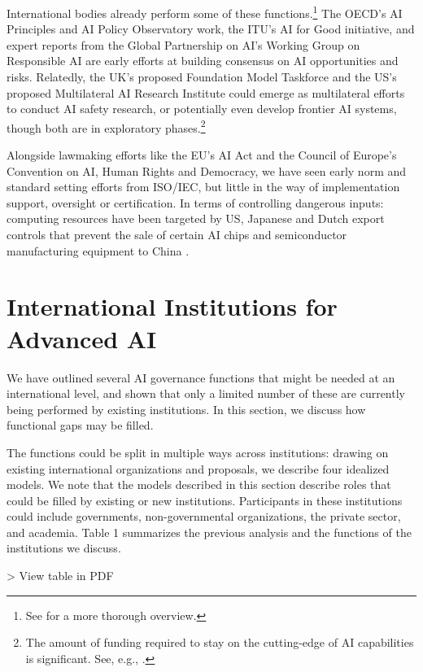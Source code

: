 \documentclass[12pt]{article}
\begin{document}
International bodies already perform some of these functions.\footnote{See
\cite{veale_ai_2023}
for a more thorough overview.} The OECD's AI Principles and AI Policy
Observatory work, the ITU's AI for Good initiative, and expert reports
from the Global Partnership on AI's Working Group on Responsible AI are
early efforts at building consensus on AI opportunities and risks. Relatedly, the
UK's proposed Foundation Model Taskforce \cite{noauthor_pm_2023}
and the US's proposed Multilateral AI Research Institute could emerge as
multilateral efforts to conduct AI safety research, or
potentially even develop frontier AI systems, though both are in
exploratory phases.\footnote{The amount of funding required to stay on
the cutting-edge of AI capabilities is significant. See, e.g., \cite{singh_anthropics_2023}.}

Alongside lawmaking efforts like the EU's AI Act and the Council of
Europe's Convention on AI, Human Rights and Democracy, we have seen
early norm and standard setting efforts from ISO/IEC, but little
in the way of implementation support, oversight or certification. In
terms of controlling dangerous inputs: computing resources have been
targeted by US, Japanese and Dutch export controls that prevent the sale
of certain AI chips and semiconductor manufacturing equipment to
China \cite{noauthor_netherlands_2023}.




\section{International Institutions for Advanced
AI}

We have outlined several AI governance functions that might be needed at
an international level, and shown that only a limited number of these
are currently being performed by existing institutions. In this section,
we discuss how functional gaps may be filled.

The functions could be split in multiple ways across institutions:
drawing on existing international organizations and proposals, we
describe four idealized models. We note that the models described in
this section describe roles that could be filled by existing or new
institutions. Participants in these institutions could include
governments, non-governmental organizations, the private sector, and
academia. Table 1 summarizes the previous analysis and the functions of
the institutions we discuss.


\begin{table}
> View table in PDF
\end{table}
\end{document}
